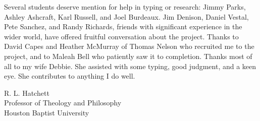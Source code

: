 Several students deserve mention for help in typing or research: Jimmy Parks, Ashley Ashcraft, Karl
Russell, and Joel Burdeaux. Jim Denison, Daniel Vestal, Pete Sanchez, and Randy Richards, friends
with significant experience in the wider world, have offered fruitful conversation about the
project. Thanks to David Capes and Heather McMurray of Thomas Nelson who recruited me to the
project, and to Maleah Bell who patiently saw it to completion. Thanks most of all to my wife
Debbie. She assisted with some typing, good judgment, and a keen eye. She contributes to anything I
do well.

\begin{signature}
R. L. Hatchett\\
Professor of Theology and Philosophy\\
Houston Baptist University
\end{signature}
